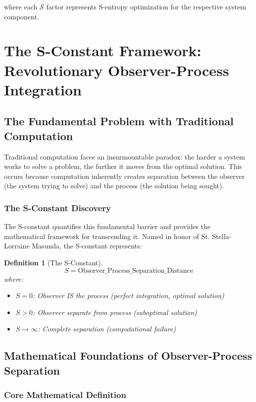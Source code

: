 \documentclass[12pt,a4paper]{article}
\newtheorem{definition}[theorem]{Definition}
\begin{document}
{{{{{{{{{{{{{{where each $\mathcal{S}$ factor represents S-entropy optimization for the respective system component.

\section{The S-Constant Framework: Revolutionary Observer-Process Integration}

\subsection{The Fundamental Problem with Traditional Computation}

Traditional computation faces an insurmountable paradox: the harder a system works to solve a problem, the further it moves from the optimal solution. This occurs because computation inherently creates separation between the observer (the system trying to solve) and the process (the solution being sought).

\subsubsection{The S-Constant Discovery}

The S-constant quantifies this fundamental barrier and provides the mathematical framework for transcending it. Named in honor of St. Stella-Lorraine Masunda, the S-constant represents:

\begin{definition}[The S-Constant]
$$S = \text{Observer\_Process\_Separation\_Distance}$$
where:
\begin{itemize}
\item $S = 0$: Observer IS the process (perfect integration, optimal solution)
\item $S > 0$: Observer separate from process (suboptimal solution)
\item $S \to \infty$: Complete separation (computational failure)
\end{itemize}
\end{definition}

\subsection{Mathematical Foundations of Observer-Process Separation}

\subsubsection{Core Mathematical Definition}

}}}}}}}}}}}}}}
\end{document}

